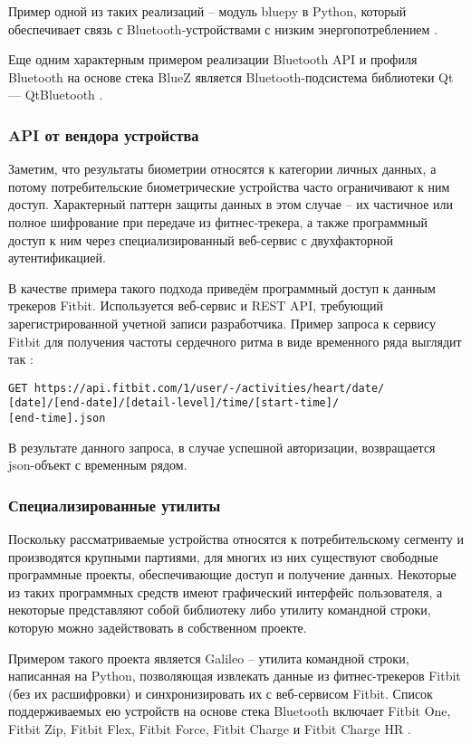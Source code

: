 \documentclass[10pt, a5paper]{article}
\begin{document}
Пример одной из таких реализаций -- модуль bluepy в Python, который обеспечивает связь с Bluetooth-устройствами с низким энергопотреблением \cite{bib4}.

Еще одним характерным примером реализации Bluetooth API и профиля Bluetooth на основе стека BlueZ является Bluetooth-подсистема библиотеки Qt --- QtBluetooth \cite{bib5}.

\subsubsection*{API от вендора устройства}

Заметим, что результаты биометрии относятся к категории личных данных, а потому потребительские биометрические устройства часто ограничивают к ним доступ. Характерный паттерн защиты данных в этом случае -- их частичное или полное шифрование при передаче из фитнес-трекера, а также программный доступ к ним через специализированный веб-сервис с двухфакторной аутентификацией.

В качестве примера такого подхода приведём программный доступ к данным трекеров Fitbit. Используется веб-сервис и REST API, требующий зарегистрированной учетной записи разработчика. Пример запроса к сервису Fitbit для получения частоты сердечного ритма в виде временного ряда выглядит так \cite{bib6}:

\begin{verbatim}
GET https://api.fitbit.com/1/user/-/activities/heart/date/
[date]/[end-date]/[detail-level]/time/[start-time]/
[end-time].json\end{verbatim}

В результате данного запроса, в случае успешной авторизации, возвращается json-объект с временным рядом.

\subsubsection*{Специализированные утилиты}

Поскольку рассматриваемые устройства относятся к потребительскому сегменту и производятся крупными партиями, для многих из них существуют свободные программные проекты, обеспечивающие доступ и получение данных. Некоторые из таких программных средств имеют графический интерфейс пользователя, а некоторые представляют собой библиотеку либо утилиту командной строки, которую можно задействовать в собственном проекте.

Примером такого проекта является Galileo -- утилита командной строки, написанная на Python, позволяющая извлекать данные из фитнес-трекеров Fitbit (без их расшифровки) и синхронизировать их с веб-сервисом Fitbit. Список поддерживаемых ею устройств на основе стека Bluetooth включает Fitbit One, Fitbit Zip, Fitbit Flex, Fitbit Force, Fitbit Charge и Fitbit Charge HR \cite{bib7}.
\end{document}
